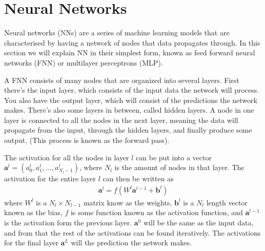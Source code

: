 



\section{Neural Networks}

Neural networks (NNs) are a series of machine learning models that are characterised by having a network of nodes that data propagates through. 
In this section we will explain NN in their simplest form, known as feed forward neural networks (FNN) or multilayer perceptrons (MLP). 

A FNN consists of many nodes that are organized into several layers. First there's the input layer, which consists of the input data the network will process. You also have the output layer, which will consist of the predictions the network makes. There's also some layers in between, called hidden layers. A node in one layer is connected to all the nodes in the next layer, meaning the data will propagate from the input, through the hidden layers, and finally produce some output. 
(This process is known as the forward pass).

The activation for all the nodes in layer $l$ can be put into a vector $\mathbf{a}^l = (a^l_{0}, a^l_1, ..., a^{l}_{N_l-1})$, where $N_l$ is the amount of nodes in that layer. %
The activation for the entire layer $l$ can then be written as
\begin{align}
	\mathbf{a}^l = f(W^l \mathbf{a}^{l-1} + \mathbf{b}^{l}) 
\end{align}
where $W^l$ is a $N_l \times N_{l-1}$ matrix know as the weights, $\mathbf{b}^{l}$ is a $N_l$ length vector known as the bias, $f$ is some function known as the activation function, and $\mathbf{a}^{l-1}$ is the activation form the previous layer. $\mathbf{a}^{0}$ will be the same as the input data, and from that the rest of the activations can be found iteratively. The activations for the final layer $\mathbf{a}^L$ will the prediction the network makes.


